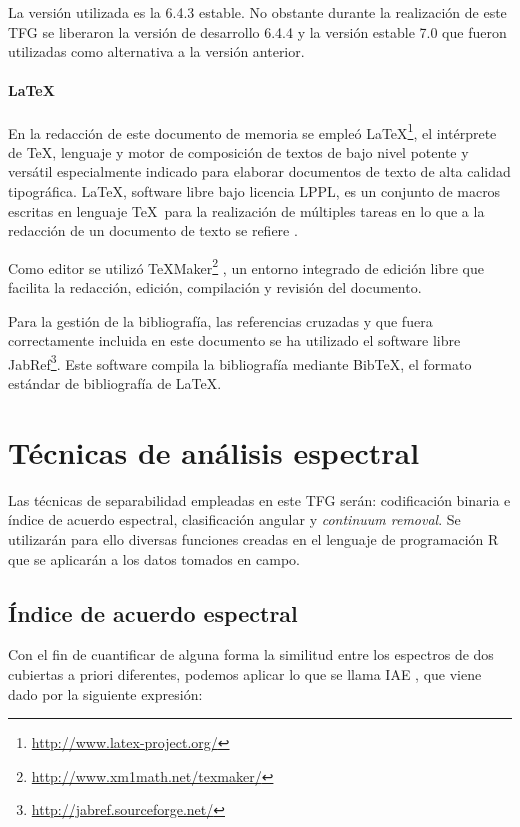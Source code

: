 La versión utilizada es la 6.4.3 estable. No obstante durante la realización de este \ac{TFG} se liberaron la versión de desarrollo 6.4.4 y la versión estable 7.0 que fueron utilizadas como alternativa a la versión anterior.

\paragraph{\LaTeX}
En la redacción de este documento de memoria se empleó \LaTeX\footnote{\url{http://www.latex-project.org/}}, el intérprete de \TeX, lenguaje y motor de composición de textos de bajo nivel potente y versátil especialmente indicado para elaborar documentos de texto de alta calidad tipográfica. \LaTeX, software libre bajo licencia LPPL, es un conjunto de macros escritas en lenguaje \TeX\ para la realización de múltiples tareas en lo que a la redacción de un documento de texto se refiere \citep{Latex2011} \citep{galindo2001} \citep{lamport1994}.%

Como editor se utilizó TeXMaker\footnote{\url{http://www.xm1math.net/texmaker/}} \citep{Brachet2003}, un entorno integrado de edición libre que facilita la redacción, edición, compilación y revisión del documento.%

Para la gestión de la bibliografía, las referencias cruzadas y que fuera correctamente incluida en este documento se ha utilizado el software libre JabRef\footnote{\url{http://jabref.sourceforge.net/}}. Este software compila la bibliografía mediante BibTeX, el formato estándar de bibliografía de \LaTeX.

\section{Técnicas de análisis espectral} \label{sec:tecnicas}
Las técnicas de separabilidad empleadas en este \ac{TFG} serán: codificación binaria e índice de acuerdo espectral, clasificación angular y \textit{continuum removal}. Se utilizarán para ello diversas funciones creadas en el lenguaje de programación R que se aplicarán a los datos tomados en campo.

\subsection{Índice de acuerdo espectral}
Con el fin de cuantificar de alguna forma la similitud entre los espectros de dos cubiertas a priori diferentes, podemos aplicar lo que se llama \ac{IAE} \citep{chuvieco2002teledeteccion}, que viene dado por la siguiente expresión:

